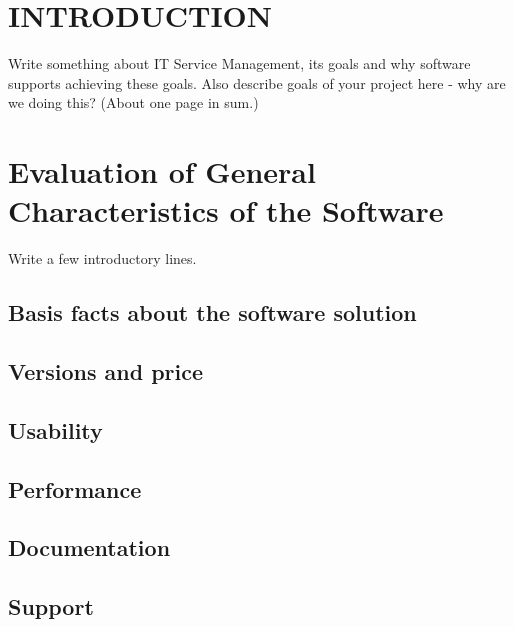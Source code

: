 
\renewcommand{\baselinestretch}{1.2}\normalsize

\chapter{INTRODUCTION}
\label{sec:introduction}

\setcounter{footnote}{1}

Write something about IT Service Management, its goals and why software supports achieving these goals. Also describe goals of your project here - why are we doing this? (About one page in sum.)

\chapter{Evaluation of General Characteristics of the Software}

Write a few introductory lines.

\section{Basis facts about the software solution}


\section{Versions and price}


\section{Usability}


\section{Performance}


\section{Documentation}


\section{Support}


